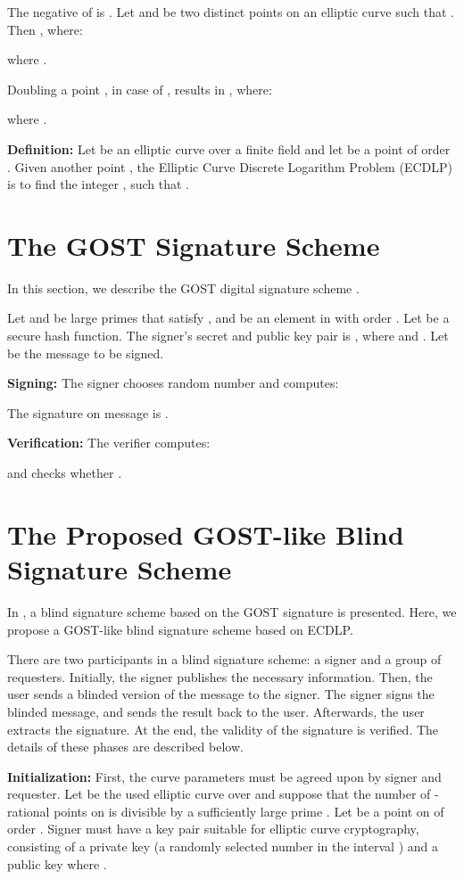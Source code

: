 \documentclass[journal,onecolumn,draftcls]{IEEEtran}
\begin{document}
The negative of  is . Let  and  be two distinct points on an elliptic curve such that . Then , where:

where . 

Doubling a point , in case of , results in , where:

where .

\textbf{Definition:} Let  be an elliptic curve over a finite field  and let  be a point of order . Given another point , the Elliptic Curve Discrete Logarithm Problem (ECDLP) is to find the integer , such that  \cite{Hankerson}.


\section{The GOST Signature Scheme}
In this section, we describe the GOST digital signature scheme \cite{Michels}.

Let  and  be large primes that satisfy , and  be an element in  with order . Let  be a secure hash function. The signer's secret and public key pair is , where  and . Let  be the message to be signed.

\textbf{Signing:} The signer chooses random number  and computes:

The signature on message  is .

\textbf{Verification:} The verifier computes:

and checks whether .


\section{The Proposed GOST-like Blind Signature Scheme}
In \cite{Huang}, a blind signature scheme based on the GOST signature is presented. Here, we propose a GOST-like blind signature scheme based on ECDLP.

There are two participants in a blind signature scheme: a signer and a group of requesters. Initially, the signer publishes the necessary information. Then, the user sends a blinded version of the message to the signer. The signer signs the blinded message, and sends the result back to the user. Afterwards, the user extracts the signature. At the end, the validity of the signature is verified. The details of these phases are described below.

\textbf{Initialization:} First, the curve parameters must be agreed upon by signer and requester. Let  be the used elliptic curve over  and suppose that the number of -rational points on  is divisible by a sufficiently large prime . Let  be a point on  of order . Signer must have a key pair suitable for elliptic curve cryptography, consisting of a private key  (a randomly selected number in the interval ) and a public key  where .
\end{document}
